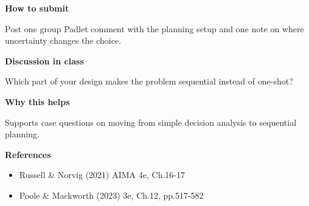 \documentclass[11pt]{article}
\begin{document}
\begin{tcolorbox}[colback=white,colframe=MidnightBlue,title={Q4 Collaborative Mini-Case},fonttitle=\bfseries,breakable]
{\large\bfseries\color{MidnightBlue} How to submit}\par\medskip
Post one group Padlet comment with the planning setup and one note on where uncertainty changes the choice.

{\large\bfseries\color{MidnightBlue} Discussion in class}\par\medskip
Which part of your design makes the problem sequential instead of one-shot?

{\large\bfseries\color{MidnightBlue} Why this helps}\par\medskip
Supports case questions on moving from simple decision analysis to sequential planning.

{\large\bfseries\color{MidnightBlue} References}\par\medskip
\begin{itemize}\item Russell \& Norvig (2021) AIMA 4e, Ch.16-17
\item Poole \& Mackworth (2023) 3e, Ch.12, pp.517-582\end{itemize}
\end{tcolorbox}
\end{document}
